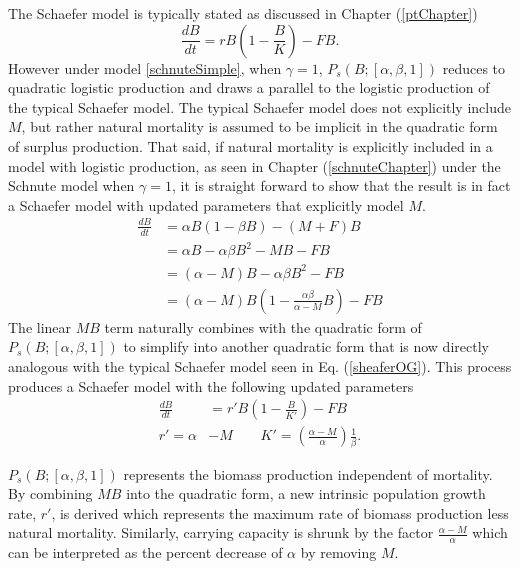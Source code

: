 The Schaefer model is typically stated as discussed in Chapter (\ref{ptChapter})
\begin{equation}
\frac{dB}{dt} = r B \left(1-\frac{B}{K}\right) - FB. \label{sheaferOG}
\end{equation}
However under model \ref{schnuteSimple}, when $\gamma=1$, 
$P_s(B;[\alpha, \beta, 1])$ reduces to quadratic logistic production and 
draws a parallel to the logistic production of the typical Schaefer model. 
The typical Schaefer model does not explicitly include $M$, but rather natural 
mortality is assumed to be implicit in the quadratic form of surplus production. 
That said, if natural mortality is explicitly included in a model with logistic 
production, as seen in Chapter (\ref{schnuteChapter}) under the Schnute model 
when $\gamma=1$, it is straight forward to show that the result is in fact a 
Schaefer model with updated parameters that explicitly model $M$. 
\begin{align}
\frac{dB}{dt} &= \alpha B \left(1-\beta B\right) - (M+F)B \nonumber\\%
&= \alpha B -\alpha\beta B^2 - M B - F B \nonumber\\
&= (\alpha-M)B -\alpha\beta B^2 - F B \nonumber\\
&= (\alpha-M)B \left(1 - \frac{\alpha\beta}{\alpha-M}B\right) - F B
\end{align}
The linear $MB$ term naturally combines with the quadratic form of 
$P_s(B;[\alpha, \beta, 1])$ to simplify into another quadratic 
form that is now directly analogous with the typical Schaefer model seen in 
Eq. (\ref{sheaferOG}). This process produces a Schaefer model with 
the following updated parameters
\begin{align}
\frac{dB}{dt} &= r' B \left(1-\frac{B}{K'}\right) - FB\\
r'=\alpha&-M ~~~~~~~~~ K'=\left(\frac{\alpha-M}{\alpha}\right)\frac{1}{\beta}.
\end{align}
%
%  

$P_s(B;[\alpha, \beta, 1])$ represents the biomass production independent of 
mortality. By combining $MB$ into the quadratic form, a new intrinsic 
population growth rate, $r'$, is derived which represents the maximum rate of 
biomass production less natural mortality. %
Similarly, 
carrying capacity is shrunk by the factor $\frac{\alpha-M}{\alpha}$ 
which can be interpreted as the percent decrease of $\alpha$ by removing $M$.

